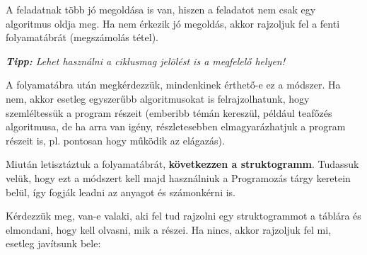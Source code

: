 \documentclass[../Main.tex]{subfiles}
\begin{document}
\begin{center}
\end{center}

A feladatnak több jó megoldása is van, hiszen a feladatot nem csak egy
algoritmus oldja meg. Ha nem érkezik jó megoldás, akkor rajzoljuk fel
a fenti folyamatábrát (megszámolás tétel).

\textit{\textbf{Tipp: }Lehet használni a ciklusmag jelölést is a megfelelő helyen!}

A folyamatábra után megkérdezzük, mindenkinek érthető-e ez a módszer.
Ha nem, akkor esetleg egyszerűbb algoritmusokat is felrajzolhatunk,
hogy szemléltessük a program részeit (emberibb témán kereszül, például
teafőzés algoritmusa, de ha arra van igény, részletesebben elmagyarázhatjuk
a program részeit is, pl. pontosan hogy működik az elágazás).

Miután letisztáztuk a folyamatábrát, \textbf{következzen a struktogramm}.
Tudassuk velük, hogy ezt a módszert kell majd használniuk a Programozás tárgy keretein belül, így fogják leadni az anyagot és számonkérni is.

Kérdezzük meg, van-e valaki, aki fel tud rajzolni egy struktogrammot a táblára és elmondani, hogy kell olvasni, mik a részei.
Ha nincs, akkor rajzoljuk fel mi, esetleg javítsunk bele:
\end{document}
